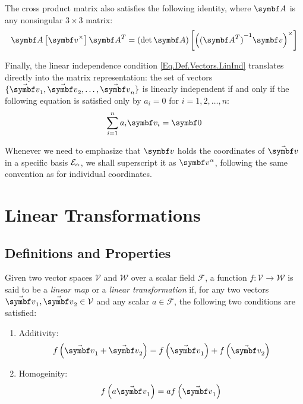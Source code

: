 The cross product matrix also satisfies the following identity, where $\mat{A}$ is any nonsingular $3 \times 3$ matrix:
\begin{equation} \label{Eq.Res.V2Skew}
\mat{A} \vskew{\mcol{v}} \tr{\mat{A}} = (\det \mat{A}) \vskew{\rndp{\inv{(\tr{\mat{A}})}\mcol{v}}}
\end{equation}

Finally, the linear independence condition \eqref{Eq.Def.Vectors.LinInd} translates directly into the matrix representation: the set of vectors $\{\vasub{v}{1},\vasub{v}{2},\dots,\vasub{v}{n}\}$ is linearly independent if and only if the following equation is satisfied only by $a_i=0$ for $i=1,2,\dots,n$:
\begin{equation} \label{Eq.Res.VectColMat.LinInd}
\sum_{i=1}^{n}{a_i \vsub{v}{i}} = \mcol{0}
\end{equation}

Whenever we need to emphasize that $\mcol{v}$ holds the coordinates of $\vabs{v}$ in a specific basis $\basis[\alpha]$, we shall superscript it as $\vprj{v}{\alpha}$, following the same convention as for individual coordinates.

\section{Linear Transformations}

\subsection{Definitions and Properties} \label{S:LinTr:DefProp}
Given two vector spaces $\mathcal{V}$ and $\mathcal{W}$ over a scalar field $\mathcal{F}$, a function $f:\mathcal{V}\rightarrow\mathcal{W}$ is said to be a \emph{linear map} or a \emph{linear transformation} if, for any two vectors $\vasub{v}{1}, \vasub{v}{2} \in \mathcal{V}$ and any scalar $a\in\mathcal{F}$, the following two conditions are satisfied:

\begin{enumerate}
\item Additivity:
	\begin{equation} \label{E:LinTr:Prop:Add}
	f\rndp{\vasub{v}{1}+\vasub{v}{2}}=f\rndp{\vasub{v}{1}}+f\rndp{\vasub{v}{2}} 
	\end{equation}
\item Homogeinity:
	\begin{equation} \label{E:LinTr:Prop:Hom}
	f\rndp{a\vasub{v}{1}}=af\rndp{\vasub{v}{1}}
	\end{equation}
\end{enumerate}

